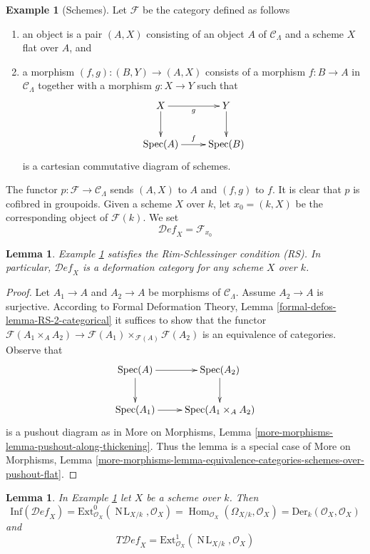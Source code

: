 \documentclass{stacks-project}
\theoremstyle{plain}
\newtheorem{lemma}[subsection]{Lemma}
\theoremstyle{definition}
\newtheorem{example}[subsection]{Example}
\theoremstyle{remark}
\numberwithin{equation}{subsection}
\def\Spec{\mathop{\mathrm{Spec}}}
\def\Hom{\mathop{\mathrm{Hom}}\nolimits}
\def\NL{\mathop{N\!L}\nolimits}
\def\Deformationcategory{\mathcal{D}\!\mathit{ef}}
\begin{document}
\begin{example}[Schemes]
\label{example-schemes}
Let $\mathcal{F}$ be the category defined as follows
\begin{enumerate}
\item an object is a pair $(A, X)$ consisting of an
object $A$ of $\mathcal{C}_\Lambda$ and a scheme $X$ flat over $A$, and
\item a morphism $(f, g) : (B, Y) \to (A, X)$ consists of
a morphism $f : B \to A$ in $\mathcal{C}_\Lambda$ together
with a morphism $g : X \to Y$ such that
$$
\xymatrix{
X \ar[r]_g \ar[d] & Y \ar[d] \\
\Spec(A) \ar[r]^f & \Spec(B)
}
$$
is a cartesian commutative diagram of schemes.
\end{enumerate}
The functor $p : \mathcal{F} \to \mathcal{C}_\Lambda$ sends $(A, X)$
to $A$ and $(f, g)$ to $f$. It is clear that $p$ is cofibred in groupoids.
Given a scheme $X$ over $k$, let $x_0 = (k, X)$ be the corresponding object
of $\mathcal{F}(k)$. We set
$$
\Deformationcategory_X = \mathcal{F}_{x_0}
$$
\end{example}

\begin{lemma}
\label{lemma-schemes-RS}
Example \ref{example-schemes}
satisfies the Rim-Schlessinger condition (RS).
In particular, $\Deformationcategory_X$ is a deformation category
for any scheme $X$ over $k$.
\end{lemma}

\begin{proof}
Let $A_1 \to A$ and $A_2 \to A$ be morphisms of $\mathcal{C}_\Lambda$.
Assume $A_2 \to A$ is surjective. According to
Formal Deformation Theory, Lemma
\ref{formal-defos-lemma-RS-2-categorical}
it suffices to show that the functor
$\mathcal{F}(A_1 \times_A A_2) \to
\mathcal{F}(A_1) \times_{\mathcal{F}(A)} \mathcal{F}(A_2)$
is an equivalence of categories.
Observe that
$$
\xymatrix{
\Spec(A) \ar[r] \ar[d] & \Spec(A_2) \ar[d] \\
\Spec(A_1) \ar[r] &
\Spec(A_1 \times_A A_2)
}
$$
is a pushout diagram as in More on Morphisms, Lemma
\ref{more-morphisms-lemma-pushout-along-thickening}.
Thus the lemma is a special case of More on Morphisms, Lemma
\ref{more-morphisms-lemma-equivalence-categories-schemes-over-pushout-flat}.
\end{proof}

\begin{lemma}
\label{lemma-schemes-TI}
In Example \ref{example-schemes} let $X$ be a scheme over $k$. Then
$$
\text{Inf}(\Deformationcategory_X) =
\text{Ext}^0_{\mathcal{O}_X}(\NL_{X/k}, \mathcal{O}_X) =
\Hom_{\mathcal{O}_X}(\Omega_{X/k}, \mathcal{O}_X) =
\text{Der}_k(\mathcal{O}_X, \mathcal{O}_X)
$$
and
$$
T\Deformationcategory_X =
\text{Ext}^1_{\mathcal{O}_X}(\NL_{X/k}, \mathcal{O}_X)
$$
\end{lemma}
\end{document}
